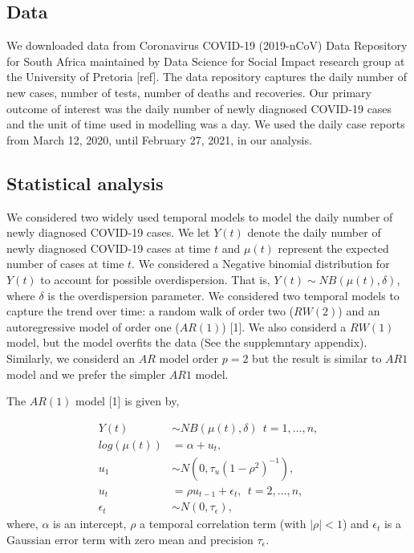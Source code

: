 \documentclass[10pt,letterpaper]{article}
\begin{document}
\hypertarget{data}{%
\subsection{Data}\label{data}}

We downloaded data from Coronavirus COVID-19 (2019-nCoV) Data Repository
for South Africa maintained by Data Science for Social Impact research
group at the University of Pretoria {[}ref{]}. The data repository
captures the daily number of new cases, number of tests, number of
deaths and recoveries. Our primary outcome of interest was the daily
number of newly diagnosed COVID-19 cases and the unit of time used in
modelling was a day. We used the daily case reports from March 12, 2020,
until February 27, 2021, in our analysis.

\hypertarget{statistical-analysis}{%
\subsection{Statistical analysis}\label{statistical-analysis}}

We considered two widely used temporal models to model the daily number
of newly diagnosed COVID-19 cases. We let \(Y(t)\) denote the daily
number of newly diagnosed COVID-19 cases at time \(t\) and \(\mu(t)\)
represent the expected number of cases at time \(t\). We considered a
Negative binomial distribution for \(Y(t)\) to account for possible
overdispersion. That is, \(Y(t) \sim NB(\mu(t), \delta)\), where
\(\delta\) is the overdispersion parameter. We considered two temporal
models to capture the trend over time: a random walk of order two
(\(RW(2)\)) and an autoregressive model of order one (\(AR(1)\))
{[}1{]}. We also considerd a \(RW(1)\) model, but the model overfits the
data (See the supplemntary appendix). Similarly, we considerd an \(AR\)
model order \(p=2\) but the result is similar to \(AR1\) model and we
prefer the simpler \(AR1\) model.

The \(AR(1)\) model {[}1{]} is given by,

\[
\begin{aligned}
 Y(t) &\sim NB(\mu(t), \delta) \ \ t=1, \dots, n,\\
 log(\mu(t)) &= \alpha+u_t, \\
 u_1 &\sim N(0, \tau_u(1-\rho^2)^{-1}),  \\
  u_t &=\rho u_{t-1} +\epsilon_t, \ \ t=2, \dots, n,  \\
  \epsilon_t & \sim N(0, \tau_{\epsilon}),
\end{aligned}
\] where, \(\alpha\) is an intercept, \(\rho\) a temporal correlation
term (with \(|\rho|<1\)) and \(\epsilon_t\) is a Gaussian error term
with zero mean and precision \(\tau_{\epsilon}\).
\end{document}
